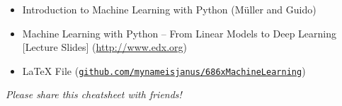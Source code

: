 \documentclass[10pt,landscape,a4paper]{article}
\begin{document}
\begin{multicols*}{3}
\bigskip

\begin{itemize}
\item Introduction to Machine Learning with Python (M\"uller and Guido)
\item Machine Learning with Python -- From Linear Models to Deep Learning [Lecture Slides] (\url{http://www.edx.org})
\item LaTeX File (\texttt{\href{https://github.com/mynameisjanus/686xMachineLearning}{github.com/mynameisjanus/686xMachineLearning}})
\end{itemize}

\begin{center}\emph{Please share this cheatsheet with friends!}\end{center}

\end{multicols*}
\end{document}
